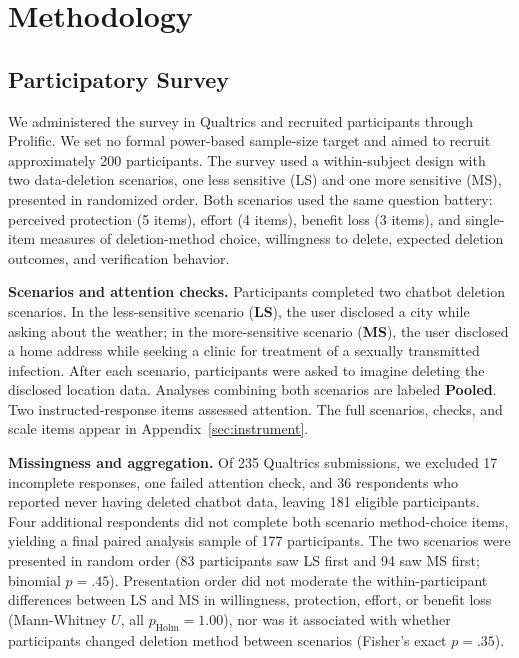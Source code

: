 \documentclass[conference,compsoc]{IEEEtran}
\begin{document}
\section{Methodology}
\label{sec:methodology}

\subsection{Participatory Survey}
\label{sec:survey-methodology}
We administered the survey in Qualtrics and recruited participants through Prolific. We set no formal power-based sample-size target and aimed to recruit approximately 200 participants. The survey used a within-subject design with two data-deletion scenarios, one less sensitive (LS) and one more sensitive (MS), presented in randomized order. Both scenarios used the same question battery: perceived protection (5 items), effort (4 items), benefit loss (3 items), and single-item measures of deletion-method choice, willingness to delete, expected deletion outcomes, and verification behavior.

\textbf{Scenarios and attention checks.} Participants completed two chatbot deletion scenarios. In the less-sensitive scenario (\textbf{LS}), the user disclosed a city while asking about the weather; in the more-sensitive scenario (\textbf{MS}), the user disclosed a home address while seeking a clinic for treatment of a sexually transmitted infection. After each scenario, participants were asked to imagine deleting the disclosed location data. Analyses combining both scenarios are labeled \textbf{Pooled}. Two instructed-response items assessed attention. The full scenarios, checks, and scale items appear in Appendix~\ref{sec:instrument}.

\textbf{Missingness and aggregation.} Of 235 Qualtrics submissions, we excluded 17 incomplete responses, one failed attention check, and 36 respondents who reported never having deleted chatbot data, leaving 181 eligible participants. Four additional respondents did not complete both scenario method-choice items, yielding a final paired analysis sample of 177 participants. The two scenarios were presented in random order (83 participants saw LS first and 94 saw MS first; binomial $p=.45$). Presentation order did not moderate the within-participant differences between LS and MS in willingness, protection, effort, or benefit loss (Mann-Whitney $U$, all $p_{\mathrm{Holm}}=1.00$), nor was it associated with whether participants changed deletion method between scenarios (Fisher's exact $p=.35$).
\end{document}
